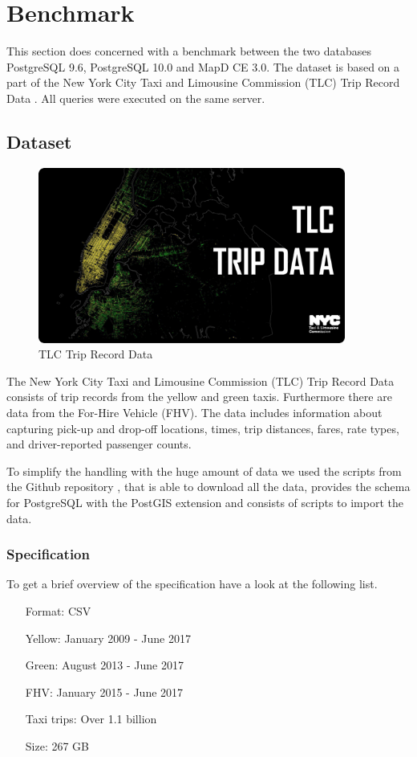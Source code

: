 \chapter{Benchmark}
This section does concerned with a benchmark between the two databases PostgreSQL 9.6, PostgreSQL 10.0 and MapD CE 3.0.
The dataset is based on a part of the New York City Taxi and Limousine Commission (TLC) Trip Record Data \cite{nyc}.
All queries were executed on the same server.

\section{Dataset}
\label{sec:dataset}
\begin{figure}[H]
\centering
\captionsetup{justification=centering}
\includegraphics[width=0.9\textwidth]{images/nyc_taxi.png}
\caption[Taxi Dropoffs]{TLC Trip Record Data}
\end{figure}

The New York City Taxi and Limousine Commission (TLC) Trip Record Data \cite{nyc} consists of trip records from the yellow and green taxis.
Furthermore there are data from the For-Hire Vehicle (FHV).
The data includes information about capturing pick-up and drop-off locations, times, trip distances, fares, rate types, and driver-reported passenger counts.

To simplify the handling with the huge amount of data we used the scripts from the Github repository \cite{nyctaxigithub}, that is able to download all the data,
provides the schema for PostgreSQL with the PostGIS \cite{postgis} extension and consists of scripts to import the data.

\subsection{Specification}
To get a brief overview of the specification have a look at the following list.
\begin{itemize}[noitemsep, topsep=0pt]
\itemsep-0.5em
 \item[Format:]  CSV
 \item[Yellow:]  January 2009 - June 2017
 \item[Green:]  August 2013 - June 2017
 \item[FHV:]  January 2015 - June 2017
 \item[Taxi trips:] Over 1.1 billion \cite{billion}
 \item[Size:] 267 GB \cite{billion}
\end{itemize}

